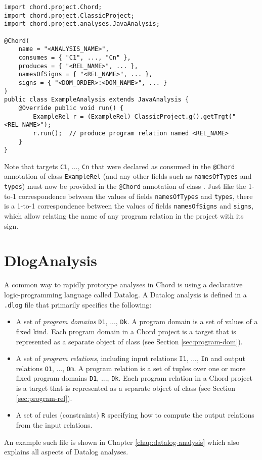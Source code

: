 \begin{framed}
\begin{verbatim}
import chord.project.Chord;
import chord.project.ClassicProject;
import chord.project.analyses.JavaAnalysis;

@Chord(
    name = "<ANALYSIS_NAME>",
    consumes = { "C1", ..., "Cn" },
    produces = { "<REL_NAME>", ... },
    namesOfSigns = { "<REL_NAME>", ... },
    signs = { "<DOM_ORDER>:<DOM_NAME>", ... }
)
public class ExampleAnalysis extends JavaAnalysis {
    @Override public void run() {
        ExampleRel r = (ExampleRel) ClassicProject.g().getTrgt("<REL_NAME>");
        r.run();  // produce program relation named <REL_NAME>
    }
}
\end{verbatim}
\end{framed}

Note that targets {\tt C1}, ..., {\tt Cn} that were declared as consumed in
the {\tt @Chord} annotation of class {\tt ExampleRel} (and any other fields
such as {\tt namesOfTypes} and {\tt types}) must now be provided in the
{\tt @Chord} annotation of class .  Just like the
1-to-1 correspondence between the values of fields {\tt namesOfTypes} and
{\tt types}, there is a 1-to-1 correspondence between the values of fields
{\tt namesOfSigns} and {\tt signs}, which allow relating the name of any program
relation in the project with its sign.

\section{DlogAnalysis}
\label{sec:dlog-analysis}

A common way to rapidly prototype analyses in Chord is using a declarative
logic-programming language called Datalog.  A Datalog analysis is defined in a
{\tt .dlog} file that primarily specifies the following:
\begin{itemize}
\item
A set of {\it program domains} {\tt D1}, ..., {\tt Dk}.  A program domain is a
set of values of a fixed kind.  Each program domain in a Chord project is
a target that is represented as a separate object of class 
(see Section \ref{sec:program-dom}).
\item
A set of {\it program relations}, including input relations {\tt I1}, ..., {\tt In}
and output relations {\tt O1}, ..., {\tt Om}.  A program relation is a set of
tuples over one or more fixed program domains {\tt D1}, ..., {\tt Dk}.  Each program
relation in a Chord project is a target that is represented as a separate object
of class  (see Section \ref{sec:program-rel}).
\item
A set of rules (constraints) {\tt R} specifying how to compute the output
relations from the input relations.
\end{itemize}
An example such file is shown in Chapter \ref{chap:datalog-analysis} which also
explains all aspects of Datalog analyses.

